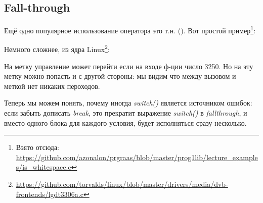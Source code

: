 ﻿\subsection{Fall-through}

Ещё одно популярное использование оператора  это т.н.  ().
Вот простой пример\footnote{Взято отсюда: \url{https://github.com/azonalon/prgraas/blob/master/prog1lib/lecture_examples/is_whitespace.c}}:



Немного сложнее, из ядра Linux\footnote{\url{https://github.com/torvalds/linux/blob/master/drivers/media/dvb-frontends/lgdt3306a.c}}:





На метку  управление может перейти если на входе ф-ции число 3250.
Но на эту метку можно попасть и с другой стороны:
мы видим что между вызовом \printf и меткой  нет никаких пероходов.

Теперь мы можем понять, почему иногда \emph{switch()} является источником ошибок: если забыть дописать \emph{break},
это прекратит выражение \emph{switch()} в \emph{fallthrough}, и вместо одного блока для каждого условия,
будет исполняться сразу несколько.

